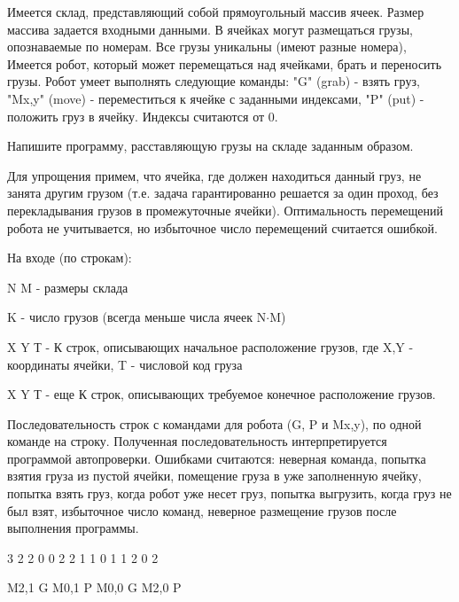 
Имеется склад, представляющий собой прямоугольный массив ячеек. Размер массива задается входными данными. В ячейках могут размещаться грузы, опознаваемые по номерам. Все грузы уникальны (имеют разные номера), Имеется робот, который может перемещаться над ячейками, брать и переносить грузы. Робот умеет выполнять следующие команды:  "G" (grab) - взять груз, "Mx,y" (move) - переместиться к ячейке с заданными индексами, "P" (put) - положить груз в ячейку.  Индексы считаются от 0.

Напишите программу, расставляющую грузы на складе заданным образом.

Для упрощения примем, что ячейка, где должен находиться данный груз, не занята другим грузом (т.е. задача гарантированно решается за один проход, без перекладывания грузов в промежуточные ячейки). Оптимальность перемещений робота не учитывается, но избыточное число перемещений считается ошибкой.

На входе (по строкам):  

N M - размеры склада

K  - число грузов (всегда меньше числа ячеек N$\cdot$M)

X Y Т  - К строк, описывающих начальное расположение грузов, где X,Y - координаты ячейки, T - числовой код груза

X Y Т - еще К строк, описывающих требуемое конечное расположение грузов.

\outputfmtSection
Последовательность строк с командами для робота (G, P и Mx,y), по одной команде на строку. Полученная последовательность интерпретируется программой автопроверки. Ошибками считаются: неверная команда, попытка взятия груза из пустой ячейки, помещение груза в уже заполненную ячейку, попытка взять груз, когда робот уже несет груз, попытка выгрузить, когда груз не был взят, избыточное число команд, неверное размещение грузов после выполнения программы.

\begin{myverbbox}[\small]{\vinput}
    3 2
    2
    0 0 2
    2 1 1
    0 1 1
    2 0 2
\end{myverbbox}
\begin{myverbbox}[\small]{\voutput}
    M2,1
    G
    M0,1
    P
    M0,0
    G
    M2,0
    P
\end{myverbbox}

